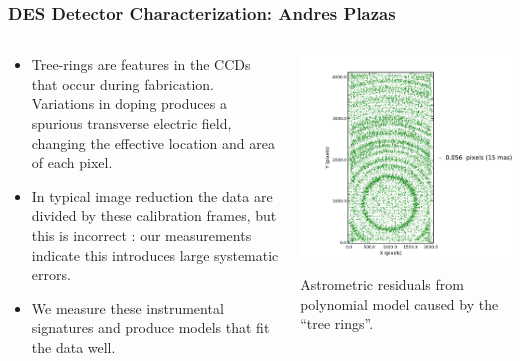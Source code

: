 \documentclass{beamer}
\begin{document}
{
    \frametitle{DES Detector Characterization: Andres Plazas}

    \fontsize{9}{0.7\baselineskip}
    \begin{columns}
        \begin{column}{0.4\textwidth}
            \begin{itemize}

                \item Tree-rings are features in the CCDs that occur during
                    fabrication.  Variations in doping produces a spurious
                    transverse electric field, changing the effective location
                    and area of each pixel.

                \item In typical image reduction the data are divided by these
                    calibration frames, but this is incorrect : our
                    measurements indicate this introduces large systematic
                    errors.

                \item We measure these instrumental signatures and produce
                    models that fit the data well.

            \end{itemize}
        \end{column}
        \begin{column}{0.6\textwidth}
            \includegraphics[width=\textwidth]{N22_astrometric_single-crop.pdf}
            \newline

            {\tiny Astrometric residuals from polynomial model caused by
            the ``tree rings''. \par}


        \end{column}
    \end{columns}


}
\end{document}
